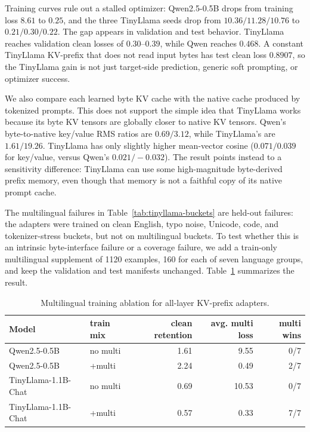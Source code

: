 \documentclass[runningheads]{llncs}
\newcommand{\qwen}{Qwen2.5-0.5B}
\newcommand{\tinyllama}{TinyLlama-1.1B-Chat}
\begin{document}
Training curves rule out a stalled optimizer: Qwen2.5-0.5B drops from training loss $8.61$ to $0.25$, and the three TinyLlama seeds drop from $10.36/11.28/10.76$ to $0.21/0.30/0.22$. The gap appears in validation and test behavior. TinyLlama reaches validation clean losses of $0.30$--$0.39$, while Qwen reaches $0.468$. A constant TinyLlama KV-prefix that does not read input bytes has test clean loss $0.8907$, so the TinyLlama gain is not just target-side prediction, generic soft prompting, or optimizer success.

We also compare each learned byte KV cache with the native cache produced by tokenized prompts. This does not support the simple idea that TinyLlama works because its byte KV tensors are globally closer to native KV tensors. Qwen's byte-to-native key/value RMS ratios are $0.69/3.12$, while TinyLlama's are $1.61/19.26$. TinyLlama has only slightly higher mean-vector cosine ($0.071/0.039$ for key/value, versus Qwen's $0.021/-0.032$). The result points instead to a sensitivity difference: TinyLlama can use some high-magnitude byte-derived prefix memory, even though that memory is not a faithful copy of its native prompt cache.

The multilingual failures in Table~\ref{tab:tinyllama-buckets} are held-out failures: the adapters were trained on clean English, typo noise, Unicode, code, and tokenizer-stress buckets, but not on multilingual buckets. To test whether this is an intrinsic byte-interface failure or a coverage failure, we add a train-only multilingual supplement of 1120 examples, 160 for each of seven language groups, and keep the validation and test manifests unchanged. Table~\ref{tab:multi-ablation} summarizes the result.

\begin{table}[!t]
\centering
\caption{Multilingual training ablation for all-layer KV-prefix adapters.}
\label{tab:multi-ablation}
\footnotesize
\setlength{\tabcolsep}{4.0pt}
\begin{tabular}{llrrr}
\toprule
Model & train mix & clean retention & avg. multi loss & multi wins \\
\midrule
\qwen{} & no multi & 1.61 & 9.55 & 0/7 \\
\qwen{} & +multi & 2.24 & 0.49 & 2/7 \\
\tinyllama{} & no multi & 0.69 & 10.53 & 0/7 \\
\tinyllama{} & +multi & 0.57 & 0.33 & 7/7 \\
\bottomrule
\end{tabular}
\end{table}
\end{document}
